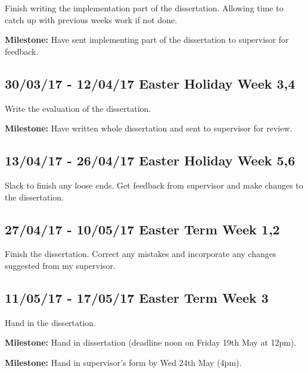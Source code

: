 \documentclass[a4paper]{article}
\begin{document}
      Finish writing the implementation part of the dissertation.
      Allowing time to catch up with previous weeks work if not done.

      \textbf{Milestone:} Have sent implementing part of the dissertation to supervisor for feedback.

    \subsection*{30/03/17 - 12/04/17 \hfill Easter Holiday Week 3,4}

      Write the evaluation of the dissertation.

      \textbf{Milestone:} Have written whole dissertation and sent to supervisor for review.


    \subsection*{13/04/17 - 26/04/17 \hfill Easter Holiday Week 5,6}

      Slack to finish any loose ends. Get feedback from supervisor and make changes to the dissertation.


    \subsection*{27/04/17 - 10/05/17 \hfill Easter Term Week 1,2}

      Finish the dissertation. Correct any mistakes and incorporate any changes suggested from my supervisor.


    \subsection*{11/05/17 - 17/05/17 \hfill Easter Term Week 3}
      Hand in the dissertation.

     \textbf{Milestone:} Hand in dissertation (deadline noon on Friday 19th May at 12pm).

     \textbf{Milestone:} Hand in supervisor's form by Wed 24th May (4pm).
\end{document}
